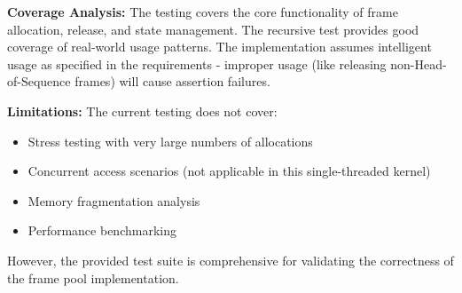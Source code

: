 \documentclass{article}
\begin{document}
\textbf{Coverage Analysis:} The testing covers the core functionality of frame allocation, release, and state management. The recursive test provides good coverage of real-world usage patterns. The implementation assumes intelligent usage as specified in the requirements - improper usage (like releasing non-Head-of-Sequence frames) will cause assertion failures.

\textbf{Limitations:} The current testing does not cover:
\begin{itemize}
    \item Stress testing with very large numbers of allocations
    \item Concurrent access scenarios (not applicable in this single-threaded kernel)
    \item Memory fragmentation analysis
    \item Performance benchmarking
\end{itemize}

However, the provided test suite is comprehensive for validating the correctness of the frame pool implementation.
\end{document}
